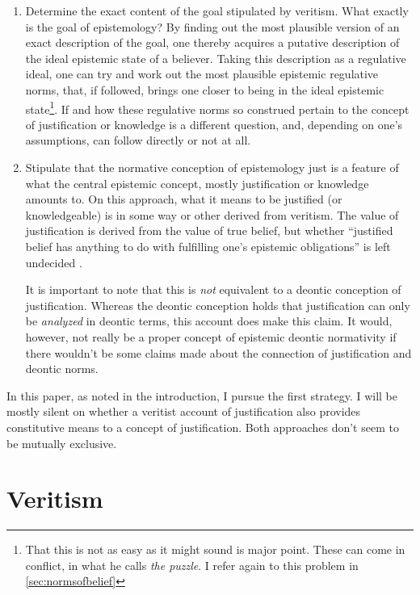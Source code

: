 \documentclass[12pt,numbers=noenddot]{scrartcl}
\begin{document}
\begin{enumerate}
    \item Determine the exact content of the goal stipulated by veritism. What exactly is the goal of epistemology? By finding out the most plausible version of an exact description of the goal, one thereby acquires a putative description of the ideal epistemic state of a believer. Taking this description as a regulative ideal, one can try and work out the most plausible epistemic regulative norms, that, if followed, brings one closer to being in the ideal epistemic state\footnote{That this is not as easy as it might sound is \textcite{Gibbons2013-GIBTNO} major point. These can come in conflict, in what he calls \emph{the puzzle}. I refer again to this problem in \ref{sec:normsofbelief}}.
    If and how these regulative norms so construed pertain to the concept of justification or knowledge is a different question, and, depending on one's assumptions, can follow directly or not at all.
    \item Stipulate that the normative conception of epistemology just is a feature of what the central epistemic concept, mostly justification or knowledge amounts to. On this approach, what it means to be justified (or knowledgeable) is in some way or other derived from veritism. The value of justification is derived from the value of true belief, but whether “justified belief has anything to do with fulfilling one's epistemic obligations” is left undecided \autocite[66]{Steup1988-STETDC}.

    It is important to note that this is \emph{not} equivalent to a deontic conception of justification. Whereas the deontic conception holds that justification can only be \emph{analyzed} in deontic terms, this account does make this claim. It would, however, not really be a proper concept of epistemic deontic normativity if there wouldn't be some claims made about the connection of justification and deontic norms.
\end{enumerate}
In this paper, as noted in the introduction, I pursue the first strategy. I will be mostly silent on whether a veritist account of justification also provides constitutive means to a concept of justification. Both approaches don't seem to be mutually exclusive.

\clearpage

\section{Veritism}
\end{document}

